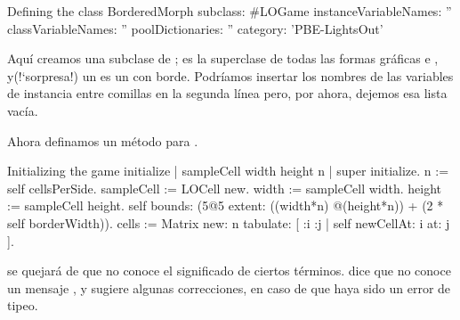 \documentclass[a4paper,10pt,twoside]{book}
\begin{document}
\begin{classdef}[sbegame]{Defining the  class}
BorderedMorph subclass: #LOGame
   instanceVariableNames: ''
   classVariableNames: ''
   poolDictionaries: ''
   category: 'PBE-LightsOut'
\end{classdef}

Aqu\'i creamos una subclase de ;  es la superclase de todas las formas gr\'aficas e \pharo, y(!`sorpresa!) un  es un  con borde.
Podr\'iamos insertar los nombres de las variables de instancia entre comillas en la segunda l\'inea pero, por ahora, dejemos esa lista vac\'ia.

Ahora definamos un m\'etodo  para .


\begin{numMethod}[sbegameinitialize]{Initializing the game}
initialize
   | sampleCell width height n |
   super initialize.
   n := self cellsPerSide.
   sampleCell := LOCell new.
   width := sampleCell width.
   height := sampleCell height.
   self bounds: (5@5 extent: ((width*n) @(height*n)) + (2 * self borderWidth)).
   cells := Matrix new: n tabulate: [ :i :j | self newCellAt: i at: j ].
\end{numMethod}

\pharo se quejar\'a de que no conoce el significado de ciertos t\'erminos.
\pharo dice que no conoce un mensaje , y sugiere algunas correcciones, en caso de que haya sido un error de tipeo.
\end{document}
